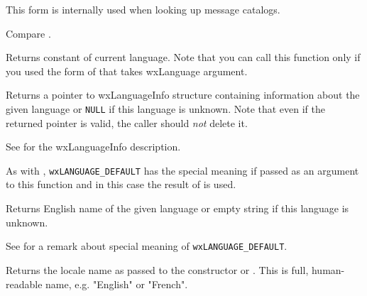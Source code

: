 This form is internally used when looking up message catalogs.

Compare .




\label{wxlocalegetlanguage}


Returns  constant of current language.
Note that you can call this function only if you used the form of
 that takes wxLanguage argument.


\label{wxlocalegetlanguageinfo}


Returns a pointer to wxLanguageInfo structure containing information about the
given language or {\tt NULL} if this language is unknown. Note that even if the
returned pointer is valid, the caller should {\it not} delete it.

See  for the wxLanguageInfo
description.

As with , \texttt{wxLANGUAGE\_DEFAULT} has the
special meaning if passed as an argument to this function and in this case the
result of  is used.


\label{wxlocalegetlanguagename}


Returns English name of the given language or empty string if this
language is unknown.

See  for a remark about
special meaning of \texttt{wxLANGUAGE\_DEFAULT}.


\label{wxlocalegetlocale}


Returns the locale name as passed to the constructor or 
. This is full, human-readable name,
e.g. "English" or "French".



\label{wxlocalegetname}


